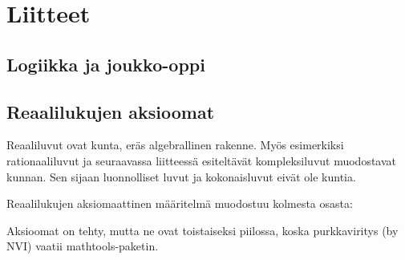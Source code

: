 \part{Liitteet}

\chapter{Logiikka ja joukko-oppi}
\chapter{Reaalilukujen aksioomat}
\label{aksioomat}
Reaaliluvut ovat kunta, eräs algebrallinen rakenne. Myös esimerkiksi rationaaliluvut ja seuraavassa liitteessä esiteltävät kompleksiluvut muodostavat kunnan. Sen sijaan luonnolliset luvut ja kokonaisluvut eivät ole kuntia.

Reaalilukujen aksiomaattinen määritelmä muodostuu kolmesta osasta:

Aksioomat on tehty, mutta ne ovat toistaiseksi piilossa, koska purkkaviritys (by NVI) vaatii mathtools-paketin.


